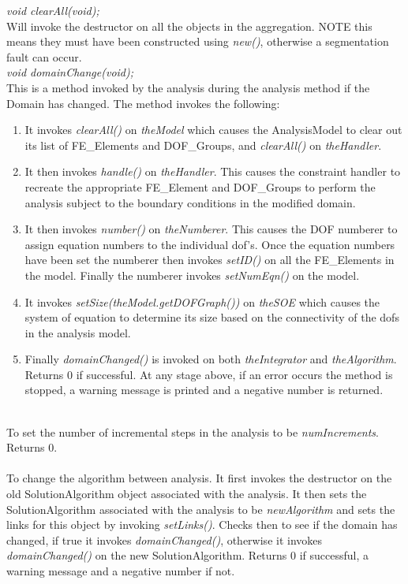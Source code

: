 {\em void clearAll(void);} \\
Will invoke the destructor on all the objects in the aggregation. NOTE
this means they must have been constructed using {\em new()},
otherwise a segmentation fault can occur.\\

{\em void domainChange(void);}\\
This is a method invoked by the analysis during the analysis method if
the Domain has changed. The method invokes the following:
\begin{enumerate} 
\item It invokes {\em clearAll()} on {\em theModel} which causes the
AnalysisModel to clear out its list of FE\_Elements and DOF\_Groups,
and {\em clearAll()} on {\em theHandler}.
\item It then invokes {\em handle()} on {\em theHandler}. This causes
the constraint handler to recreate the appropriate FE\_Element and
DOF\_Groups to perform the analysis subject to the boundary conditions
in the modified domain.
\item It then invokes {\em number()} on {\em theNumberer}. This causes
the DOF numberer to assign equation numbers to the individual
dof's. Once the equation numbers have been set the numberer then
invokes {\em setID()} on all the FE\_Elements in the model. Finally
the numberer invokes {\em setNumEqn()} on the model.
\item It invokes {\em setSize(theModel.getDOFGraph())} on {\em
theSOE} which causes the system of equation to determine its size
based on the connectivity of the dofs in the analysis model. 
\item Finally {\em domainChanged()} is invoked on both {\em theIntegrator} and 
{\em theAlgorithm}. 
Returns $0$ if successful. At any stage above, if an error occurs the
method is stopped, a warning message is printed and a negative number
is returned. \\ 
\end{enumerate}

\\ 
To set the number of incremental steps in the analysis to be {\em
numIncrements}. Returns $0$.\\

\\
To change the algorithm between analysis. It first invokes the
destructor on the old SolutionAlgorithm object associated with the
analysis. It then sets the SolutionAlgorithm 
associated with the analysis to be {\em newAlgorithm} and sets the
links for this object by invoking {\em setLinks()}. Checks then to
see if the domain has changed, if true it invokes {\em
domainChanged()}, otherwise it invokes {\em domainChanged()} on the
new SolutionAlgorithm. Returns $0$ if successful, a warning message
and a negative number if not.\\

